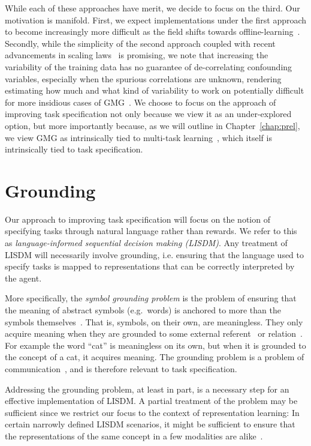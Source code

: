 \documentclass[../main.tex]{subfiles}
\begin{document}
While each of these approaches have merit, we decide to focus on the third. Our motivation is
manifold. First, we expect implementations under the first approach to become increasingly more
difficult as the field shifts towards offline-learning~\citep{lange_batch_2012, levine_offline_2020,
	prudencio_survey_2022}. Secondly, while the simplicity of the second approach coupled with recent
advancements in scaling laws~\citep{kaplan_scaling_2020, hoffmann_training_2022} is promising, we
note that increasing the variability of the training data has no guarantee of de-correlating
confounding variables, especially when the spurious correlations are unknown, rendering estimating
how much and what kind of variability to work on potentially difficult for more insidious cases of
GMG~\citep{kirk_causal_2022}. We choose to focus on the approach of improving task specification not
only because we view it as an under-explored option, but more importantly because, as we will
outline in Chapter~\ref{chap:prel}, we view GMG as intrinsically tied to multi-task
learning~\citep{caruana_multitask_1997}, which itself is intrinsically tied to task specification.

\section{Grounding}\label{back:sec:grounding}

Our approach to improving task specification will focus on the notion of specifying tasks through
natural language rather than rewards.  We refer to this as \emph{language-informed sequential
	decision making (LISDM)}. Any treatment of LISDM will necessarily involve grounding, i.e. ensuring
that the language used to specify tasks is mapped to representations that can be correctly
interpreted by the agent.

More specifically, the \emph{symbol grounding problem} is the problem of ensuring that the meaning
of abstract symbols (e.g.~words) is anchored to more than the symbols
themselves~\citep{harnad_symbol_1990}. That is, symbols, on their own, are meaningless. They only
acquire meaning when they are grounded to some external referent~\citep{bender_climbing_2020} or
relation~\citep{piantadosi_meaning_2022}. For example the word ``cat'' is meaningless on its own,
but when it is grounded to the concept of a cat, it acquires meaning. The grounding problem is
a problem of communication~\citep{clark_grounding_1991}, and is therefore relevant to task
specification.

Addressing the grounding problem, at least in part, is a necessary step for an effective
implementation of LISDM. A partial treatment of the problem may be sufficient since we restrict our
focus to the context of representation learning: In certain narrowly defined LISDM scenarios, it
might be sufficient to ensure that the representations of the same concept in a few modalities are
alike~\citep{mooney_learning_2008}.
\end{document}
